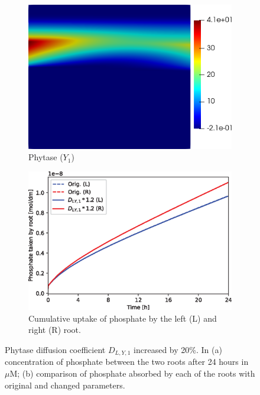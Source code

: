 \documentclass[11pt]{article}
\numberwithin{equation}{section}
\begin{document}
\begin{figure}[!htb]
\centering
\begin{subfigure}[t]{0.35\textwidth}
    \includegraphics[width=\textwidth]{Figures/Y1_DY1up20.png}
    \caption{Phytase ($Y_1$)}
    \label{fig:numexp_DLY1up1}
\end{subfigure}
\qquad
\begin{subfigure}[t]{0.4\textwidth}
    \includegraphics[width=\textwidth]{Figures/DY1up20.eps}
    \caption{Cumulative uptake of phosphate by the left (L) and right (R) root.}
    \label{fig:numexp_DLY1up2}
\end{subfigure}

\caption{Phytase diffusion coefficient $D_{L,Y,1}$ increased by 20\%. In (a) concentration of phosphate between the two roots after 24 hours in $\mu$M; (b) comparison of phosphate absorbed by each of the roots with original and changed parameters.}
\label{fig:numexp_DLY1up}
\end{figure}
\end{document}
